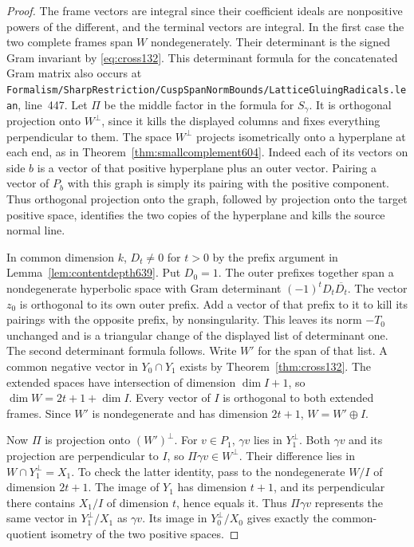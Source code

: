 \documentclass[a4paper,11pt]{article}
\theoremstyle{definition}
\theoremstyle{remark}
\newcommand{\srcloc}[2]{{\small\nolinkurl{#1.lean}}, line~#2}
\numberwithin{equation}{section}
\begin{document}
\begin{proof}
The frame vectors are integral since their coefficient ideals
are nonpositive powers of the different, and the terminal
vectors are integral. In the first case the two complete frames
span \(W\) nondegenerately. Their determinant is the signed Gram
invariant by \eqref{eq:cross132}. This determinant formula for
the concatenated Gram matrix also occurs at
\srcloc{Formalism/SharpRestriction/CuspSpanNormBounds/LatticeGluingRadicals}{447}.
Let \(\Pi\) be the middle factor in the formula for \(S_\gamma\).
It is orthogonal projection onto \(W^\perp\), since it kills
the displayed columns and fixes everything perpendicular to
them. The space \(W^\perp\) projects isometrically onto a
hyperplane at each end, as in Theorem~\ref{thm:smallcomplement604}.
Indeed each of its vectors on side \(b\) is a vector of that
positive hyperplane plus an outer vector. Pairing a vector of
\(P_b\) with this graph is simply its pairing with the positive
component. Thus orthogonal projection onto the graph, followed
by projection onto the target positive space, identifies the
two copies of the hyperplane and kills the source normal line.

In common dimension \(k\), \(D_t\ne0\) for \(t>0\) by the
prefix argument in Lemma~\ref{lem:contentdepth639}. Put \(D_0=1\).
The outer prefixes together span a nondegenerate hyperbolic
space with Gram determinant \((-1)^tD_t\overline{D_t}\).
The vector \(z_0\) is orthogonal to its own outer prefix.
Add a vector of that prefix to it to kill its pairings with the
opposite prefix, by nonsingularity. This leaves its norm
\(-T_0\) unchanged and is a triangular change of the displayed
list of determinant one. The second determinant formula follows.
Write \(W'\) for the span of that list. A common negative vector
in \(Y_0\cap Y_1\) exists by Theorem~\ref{thm:cross132}.
The extended spaces have intersection of dimension \(\dim I+1\),
so \(\dim W=2t+1+\dim I\). Every vector of \(I\) is orthogonal
to both extended frames. Since \(W'\) is nondegenerate and has
dimension \(2t+1\), \(W=W'\oplus I\).

Now \(\Pi\) is projection onto \((W')^\perp\). For \(v\in P_1\),
\(\gamma v\) lies in \(Y_1^\perp\). Both \(\gamma v\) and its
projection are perpendicular to \(I\), so
\(\Pi\gamma v\in W^\perp\). Their difference lies in
\(W\cap Y_1^\perp=X_1\). To check the latter identity, pass to
the nondegenerate \(W/I\) of dimension \(2t+1\). The image of
\(Y_1\) has dimension \(t+1\), and its perpendicular there
contains \(X_1/I\) of dimension \(t\), hence equals it.
Thus \(\Pi\gamma v\) represents the same vector in
\(Y_1^\perp/X_1\) as \(\gamma v\). Its image in
\(Y_0^\perp/X_0\) gives exactly the common-quotient isometry
of the two positive spaces.


\end{proof}
\end{document}
